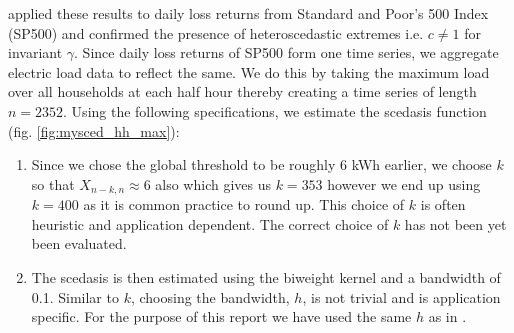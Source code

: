 
 \citet{einmahl16} applied these results to daily loss returns from Standard and Poor's 500 Index (SP500) and confirmed the presence of heteroscedastic extremes i.e. $c \neq 1$ for invariant $\gamma$. Since daily loss returns of SP500 form one time series, we aggregate electric load data to reflect the same. We do this by taking the maximum load over all households at each half hour thereby creating a time series of length $n=2352$. Using the following specifications, we estimate the scedasis function (fig. \ref{fig:mysced_hh_max}):%
\begin{enumerate}
\item Since we chose the global threshold to be roughly 6 kWh earlier, we choose $k$ so that $X_{n-k,n} \approx 6$ also which gives us $k=353$ however we end up using $k=400$ as it is common practice to round up. This choice of $k$ is often heuristic and application dependent. The correct choice of $k$ has not been yet been evaluated. 
\item The scedasis is then estimated using the biweight kernel and a bandwidth of 0.1. Similar to $k$, choosing the bandwidth, $h$, is not trivial and is application specific. For the purpose of this report we have used the same $h$ as in \citet{einmahl16}.
\end{enumerate}


